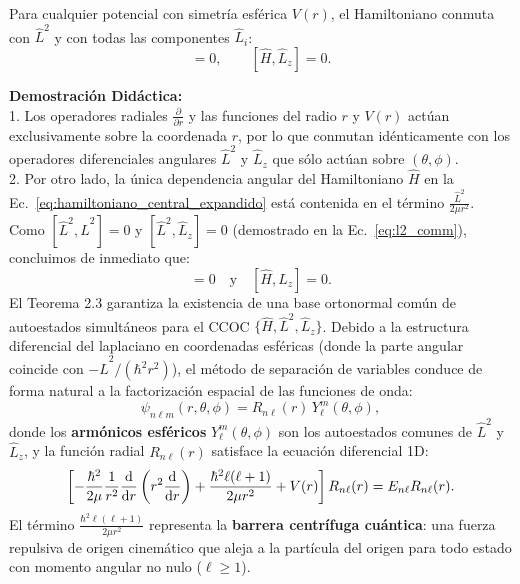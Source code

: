 \begin{teoremabox}
    Para cualquier potencial con simetría esférica $V(r)$, el Hamiltoniano conmuta con $\hat{L}^2$ y con todas las componentes $\hat{L}_i$:
    \begin{equation}
        [\hat{H}, \hat{L}^2] = 0, \qquad [\hat{H}, \hat{L}_z] = 0.
    \end{equation}
\end{teoremabox}

\textbf{Demostración Didáctica:}\\
1. Los operadores radiales $\frac{\partial}{\partial r}$ y las funciones del radio $r$ y $V(r)$ actúan exclusivamente sobre la coordenada $r$, por lo que conmutan idénticamente con los operadores diferenciales angulares $\hat{L}^2$ y $\hat{L}_z$ que sólo actúan sobre $(\theta, \phi)$.\\
2. Por otro lado, la única dependencia angular del Hamiltoniano $\hat{H}$ en la Ec.~\eqref{eq:hamiltoniano_central_expandido} está contenida en el término $\frac{\hat{L}^2}{2\mu r^2}$. Como $[\hat{L}^2, \hat{L}^2] = 0$ y $[\hat{L}^2, \hat{L}_z] = 0$ (demostrado en la Ec.~\eqref{eq:l2_comm}), concluimos de inmediato que:
\begin{equation}
    [\hat{H}, \hat{L}^2] = 0 \quad \text{y} \quad [\hat{H}, \hat{L}_z] = 0.
\end{equation}
El Teorema 2.3 garantiza la existencia de una base ortonormal común de autoestados simultáneos para el CCOC $\{\hat{H}, \hat{L}^2, \hat{L}_z\}$. Debido a la estructura diferencial del laplaciano en coordenadas esféricas (donde la parte angular coincide con $-\hat{L}^2/(\hbar^2 r^2)$), el método de separación de variables conduce de forma natural a la factorización espacial de las funciones de onda:
\begin{equation}
    \psi_{n\ell m}(r, \theta, \phi) = R_{n\ell}(r)\,Y_\ell^m(\theta, \phi),
\end{equation}
donde los \textbf{armónicos esféricos} $Y_\ell^m(\theta, \phi)$ son los autoestados comunes de $\hat{L}^2$ y $\hat{L}_z$, y la función radial $R_{n\ell}(r)$ satisface la ecuación diferencial 1D:
\begin{equation}
    \left[ -\frac{\hbar^2}{2\mu}\frac{1}{r^2}\frac{\mathrm{d}}{\mathrm{d} r}\left(r^2\frac{\mathrm{d}}{\mathrm{d} r}\right) + \frac{\hbar^2\ell(\ell+1)}{2\mu r^2} + V(r) \right] R_{n\ell}(r) = E_{n\ell} R_{n\ell}(r).
\end{equation}
El término $\frac{\hbar^2\ell(\ell+1)}{2\mu r^2}$ representa la \textbf{barrera centrífuga cuántica}: una fuerza repulsiva de origen cinemático que aleja a la partícula del origen para todo estado con momento angular no nulo ($\ell \ge 1$).

